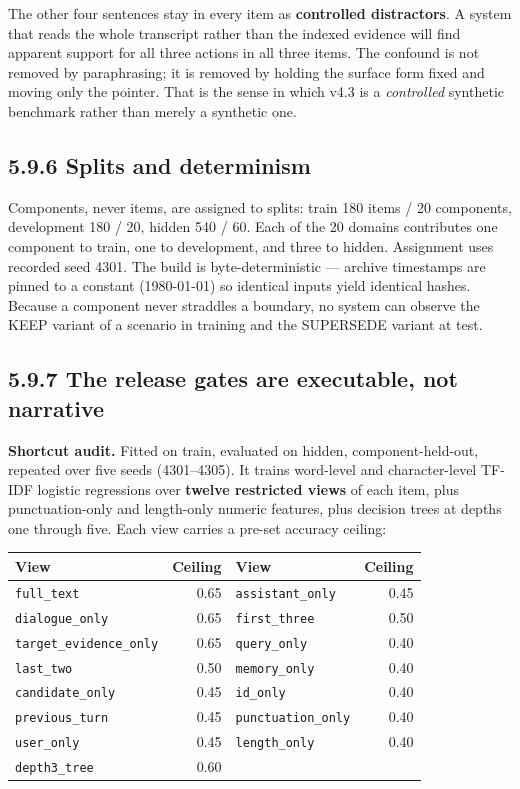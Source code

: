 The other four sentences stay in every item as \textbf{controlled
distractors}. A system that reads the whole transcript rather than the
indexed evidence will find apparent support for all three actions in all
three items. The confound is not removed by paraphrasing; it is removed
by holding the surface form fixed and moving only the pointer. That is
the sense in which v4.3 is a \emph{controlled} synthetic benchmark
rather than merely a synthetic one.

\subsection{5.9.6 Splits and determinism}\label{splits-and-determinism}

Components, never items, are assigned to splits: train 180 items / 20
components, development 180 / 20, hidden 540 / 60. Each of the 20
domains contributes one component to train, one to development, and
three to hidden. Assignment uses recorded seed 4301. The build is
byte-deterministic --- archive timestamps are pinned to a constant
(1980-01-01) so identical inputs yield identical hashes. Because a
component never straddles a boundary, no system can observe the KEEP
variant of a scenario in training and the SUPERSEDE variant at test.

\subsection{5.9.7 The release gates are executable, not
narrative}\label{the-release-gates-are-executable-not-narrative}

\textbf{Shortcut audit.} Fitted on train, evaluated on hidden,
component-held-out, repeated over five seeds (4301--4305). It trains
word-level and character-level TF-IDF logistic regressions over
\textbf{twelve restricted views} of each item, plus punctuation-only and
length-only numeric features, plus decision trees at depths one through
five. Each view carries a pre-set accuracy ceiling:

{\def\LTcaptype{none} %
\begin{longtable}[]{@{}lrlr@{}}
\toprule\noalign{}
View & Ceiling & View & Ceiling \\
\midrule\noalign{}
\endhead
\bottomrule\noalign{}
\endlastfoot
\texttt{full\_text} & 0.65 & \texttt{assistant\_only} & 0.45 \\
\texttt{dialogue\_only} & 0.65 & \texttt{first\_three} & 0.50 \\
\texttt{target\_evidence\_only} & 0.65 & \texttt{query\_only} & 0.40 \\
\texttt{last\_two} & 0.50 & \texttt{memory\_only} & 0.40 \\
\texttt{candidate\_only} & 0.45 & \texttt{id\_only} & 0.40 \\
\texttt{previous\_turn} & 0.45 & \texttt{punctuation\_only} & 0.40 \\
\texttt{user\_only} & 0.45 & \texttt{length\_only} & 0.40 \\
\texttt{depth3\_tree} & 0.60 & & \\
\end{longtable}
}

